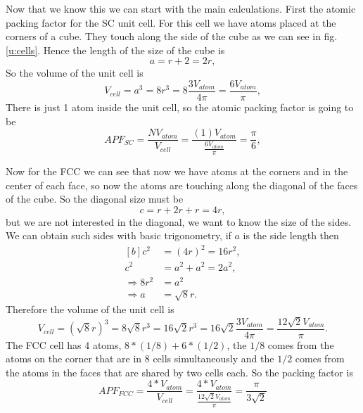 \begin{questions}
\begin{solution}
Now that we know this we can start with the main calculations. First the atomic packing factor for the SC unit cell. For this cell we have atoms placed at the corners of a cube. They touch along the side of the cube as we can see in fig. \ref{u:cells}. Hence the length of the size of the cube is
\begin{equation*}
  a = r + 2 = 2r,
\end{equation*}
So the volume of the unit cell is
\begin{equation}
  V_{cell} = a^3 = 8r^3 =8\frac{3V_{atom}}{4\pi} =\frac{6V_{atom}}{\pi},
\end{equation}
There is just 1 atom inside the unit cell, so the atomic packing factor is going to be
\begin{equation}
  APF_{SC} = \frac{NV_{atom}}{V_{cell}} = \frac{(1)V_{atom}}{\frac{6V_{atom}}{\pi}} = \frac{\pi}{6},
\end{equation}
\end{solution}
\begin{solution}
  Now for the FCC we can see that now we have atoms at the corners and in the center of each face, so now the atoms are touching along the diagonal of the faces of the cube. So the diagonal size must be
  \begin{equation}
    c = r + 2r + r = 4r,
  \end{equation}
  but we are not interested in the diagonal, we want to know the size of the sides. We can obtain such sides with basic trigonometry, if $a$ is the side length then
  \begin{equation}
    \begin{aligned}[b]
      c^2 &= (4r)^2 = 16r^2, \\
      c^2 &= a^2 + a^2 = 2a^2,\\
      \Rightarrow 8r^2 &= a^2\\
      \Rightarrow a &= \sqrt{8}r.
    \end{aligned}
  \end{equation}
  Therefore the volume of the unit cell is
  \begin{equation}
    V_{cell} = (\sqrt{8}r)^3 = 8\sqrt{8}r^3 = 16\sqrt{2}r^3 = 16\sqrt{2}\frac{3V_{atom}}{4\pi} = \frac{12\sqrt{2}V_{atom}}{\pi} .
  \end{equation}
  The FCC cell has 4 atoms, $8*(1/8) + 6*(1/2)$, the $1/8$ comes from the atoms on the corner that are in 8 cells simultaneously and the $1/2$ comes from the atoms in the faces that are shared by two cells each. So the packing factor is
  \begin{equation}
    APF_{FCC} = \frac{4*V_{atom}}{V_{cell}} = \frac{4*V_{atom}}{\frac{12\sqrt{2}V_{atom}}{\pi}} =  \frac{\pi}{3\sqrt{2}}
  \end{equation}
\end{solution}
\end{questions}

